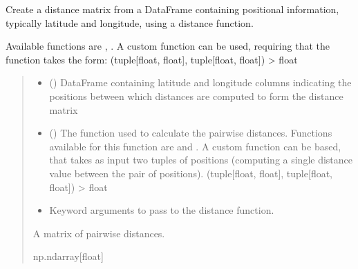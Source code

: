 \documentclass[letterpaper,10pt,english]{sphinxmanual}
\begin{document}
\begin{fulllineitems}
\label{\detokenize{misc:glomar_gridding.distances.calculate_distance_matrix}}
\pysigstartsignatures
\pysiglinewithargsret
{}
{\sphinxparamcomma {}\sphinxparamcomma {}}
{}
\pysigstopsignatures
\sphinxAtStartPar
Create a distance matrix from a DataFrame containing positional information,
typically latitude and longitude, using a distance function.

\sphinxAtStartPar
Available functions are , . A
custom function can be used, requiring that the function takes the form:
(tuple{[}float, float{]}, tuple{[}float, float{]}) \sphinxhyphen{}\textgreater{} float
\begin{quote}\begin{description}
\begin{itemize}
\item {}
\sphinxAtStartPar
{} () \textendash{} DataFrame containing latitude and longitude columns indicating the
positions between which distances are computed to form the distance
matrix

\item {}
\sphinxAtStartPar
{} () \textendash{} The function used to calculate the pairwise distances. Functions
available for this function are  and
.
A custom function can be based, that takes as input two tuples of
positions (computing a single distance value between the pair of
positions). (tuple{[}float, float{]}, tuple{[}float, float{]}) \sphinxhyphen{}\textgreater{} float

\item {}
\sphinxAtStartPar
{} \textendash{} Keyword arguments to pass to the distance function.

\end{itemize}

\sphinxAtStartPar
{} \textendash{} A matrix of pairwise distances.

\sphinxAtStartPar
np.ndarray{[}float{]}

\end{description}\end{quote}

\end{fulllineitems}
\end{document}
